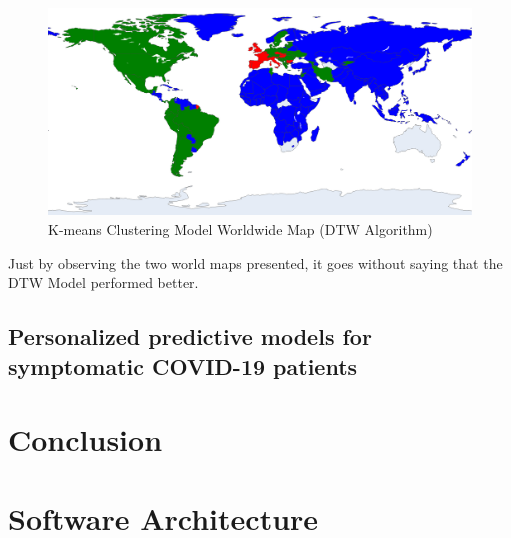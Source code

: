 \documentclass[11pt,a4paper]{article}
\begin{document}
\begin{figure}[H]
    \begin{center}
        \includegraphics[scale=0.9]{img/dtw-clusters-map.png}
    \end{center}
    \caption{K-means Clustering Model Worldwide Map (DTW Algorithm)}
\end{figure}
\noindent
Just by observing the two world maps presented, it goes without saying that the
DTW Model performed better.
\subsection{Personalized predictive models for symptomatic COVID-19 patients}

\newpage
\section{Conclusion}

\newpage
\section{Software Architecture}

\newpage
\printbibliography
\end{document}

